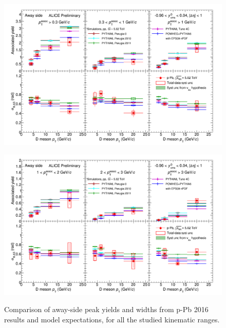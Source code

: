 \begin{figure}[!htbp]
\centering
{\includegraphics[width=1.3\linewidth, angle=90]{figures/CfrPPandModels/ComparePPbtoMCFitResultsAS.png}}
\end{figure}
\begin{figure}[!htbp]
\centering
{\includegraphics[width=1.3\linewidth, angle=90]{figures/CfrPPandModels/ComparePPbtoMCFitResultsAS_2.png}}
\caption{Comparison of away-side peak yields and widths from p-Pb 2016 results and model expectations, for all the studied kinematic ranges.}
\label{fig:CfrObsModel2}
\end{figure}
